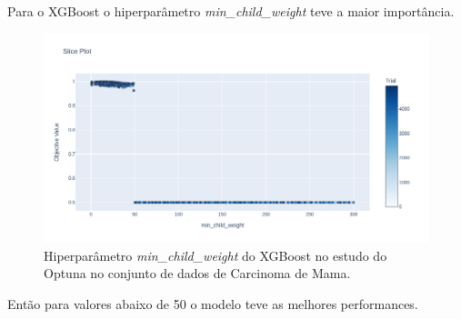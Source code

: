 Para o XGBoost o hiperparâmetro \textit{min\_child\_weight} teve a maior importância.
\begin{figure}[H]
 \caption{Hiperparâmetro \textit{min\_child\_weight} do XGBoost no estudo do Optuna no conjunto de dados de Carcinoma de Mama.}
 \label{fig:op:cancer:min:xgb}
 \centering
 \includegraphics[scale=0.3]{images/optuna_xgboost_min_cancer.png}
\end{figure}
Então para valores abaixo de 50 o modelo teve as melhores performances.

